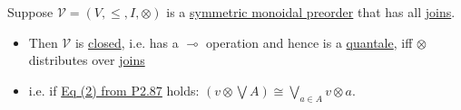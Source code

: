 Suppose $\mathcal{V}=(V,\leq,I,\otimes)$ is a \hyperref[D2.2]{symmetric monoidal preorder} that has all \hyperref[D1.81]{joins}.
    \begin{itemize}
      \item Then $\mathcal{V}$ is \hyperref[D2.79]{closed}, i.e. has a $\multimap$ operation and hence is a \hyperref[D2.90]{quantale}, iff $\otimes$ distributes over \hyperref[D1.81]{joins}
      \item i.e. if \hyperref[P2.87]{Eq (2) from P2.87} holds:  $(v \otimes \bigvee A)\cong  \bigvee_{a \in A} v \otimes a$.
    \end{itemize}